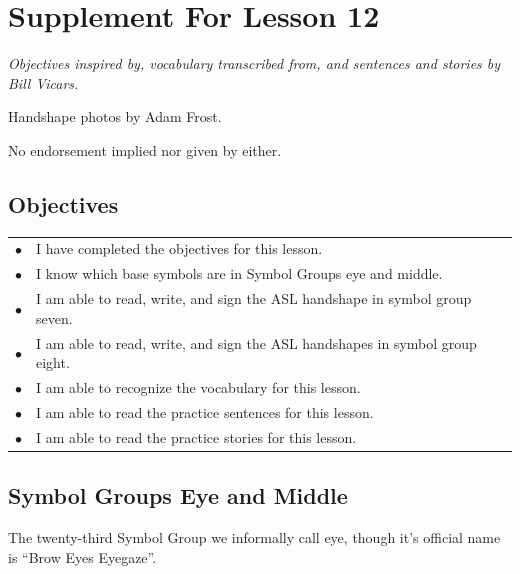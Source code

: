 \documentclass{article}
\begin{document}
\newfontfamily{}
\newfontfamily{}
\newcommand{\bul}{\hfil$\bullet$&}
\renewenvironment{glossary}{\begin{multicols}{5}\begin{center}}{\end{center}\end{multicols}}
\setcounter{secnumdepth}{0}
\setlength{\columnseprule}{1pt}

\section{Supplement For Lesson 12}

\begin{center}
\it
Objectives inspired by, vocabulary transcribed from, and sentences and stories by Bill Vicars.

Handshape photos by Adam Frost.

No endorsement implied nor given by either.
\end{center}

\subsection{Objectives}

\begin{tabular}{p{1cm}p{14cm}}
\bul I have completed the objectives for this lesson.\\
\bul I know which base symbols are in Symbol Groups eye and middle.\\
\bul I am able to read, write, and sign the ASL handshape in symbol group seven.\\
\bul I am able to read, write, and sign the ASL handshapes in symbol group eight.\\
\bul I am able to recognize the vocabulary for this lesson.\\
\bul I am able to read the practice sentences for this lesson.\\
\bul I am able to read the practice stories for this lesson.\\
\end{tabular}

\subsection{Symbol Groups Eye and Middle}

The twenty-third Symbol Group we informally call eye, though it's official name is ``Brow Eyes Eyegaze''.
\end{document}
